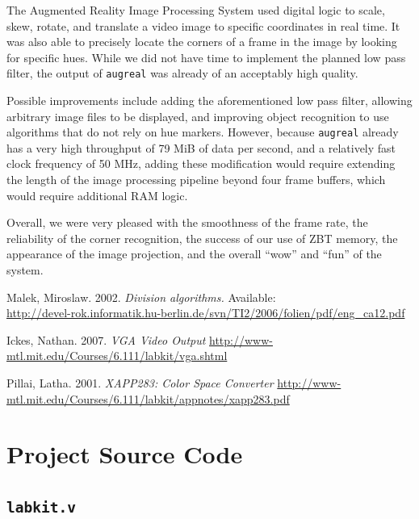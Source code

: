 \documentclass[10pt]{article}
\begin{document}
The Augmented Reality Image Processing System used digital logic to scale, skew, rotate, and translate a video image to specific coordinates in real time. It was also able to precisely locate the corners of a frame in the image by looking for specific hues. While we did not have time to implement the planned low pass filter, the output of {\tt augreal} was already of an acceptably high quality.

Possible improvements include adding the aforementioned low pass filter, allowing arbitrary image files to be displayed, and improving object recognition to use algorithms that do not rely on hue markers. However, because {\tt augreal} already has a very high throughput of 79 MiB of data per second, and a relatively fast clock frequency of 50 MHz, adding these modification would require extending the length of the image processing pipeline beyond four frame buffers, which would require additional RAM logic.

Overall, we were very pleased with the smoothness of the frame rate, the reliability of the corner recognition, the success of our use of ZBT memory, the appearance of the image projection, and the overall ``wow'' and ``fun'' of the system.

\begin{thebibliography}{9}

  Malek, Miroslaw.
  2002.
  \emph{Division algorithms.}
  Available: \\ \url{http://devel-rok.informatik.hu-berlin.de/svn/TI2/2006/folien/pdf/eng\_ca12.pdf}

  Ickes, Nathan.
  2007.
  \emph{VGA Video Output}
  \url{http://www-mtl.mit.edu/Courses/6.111/labkit/vga.shtml}

  Pillai, Latha.
  2001.
  \emph{XAPP283: Color Space Converter}
  \url{http://www-mtl.mit.edu/Courses/6.111/labkit/appnotes/xapp283.pdf}

\end{thebibliography}

\newpage
\appendix
\section{Project Source Code}
\subsection{{\tt labkit.v}}


	  	
\end{document}
